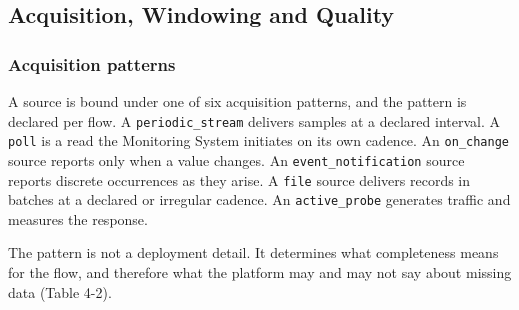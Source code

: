 \hypertarget{acquisition-windowing-and-quality}{%
\subsection{Acquisition, Windowing and Quality}\label{acquisition-windowing-and-quality}}

\hypertarget{acquisition-patterns}{%
\subsubsection{Acquisition patterns}\label{acquisition-patterns}}

A source is bound under one of six acquisition patterns, and the pattern
is declared per flow. A \texttt{periodic\_\allowbreak{}stream} delivers samples at a
declared interval. A \texttt{poll} is a read the Monitoring System
initiates on its own cadence. An \texttt{on\_\allowbreak{}change} source reports only
when a value changes. An \texttt{event\_\allowbreak{}notification} source reports
discrete occurrences as they arise. A \texttt{file} source delivers
records in batches at a declared or irregular cadence. An
\texttt{active\_\allowbreak{}probe} generates traffic and measures the response.

The pattern is not a deployment detail. It determines what completeness
means for the flow, and therefore what the platform may and may not say
about missing data (Table 4-2).

